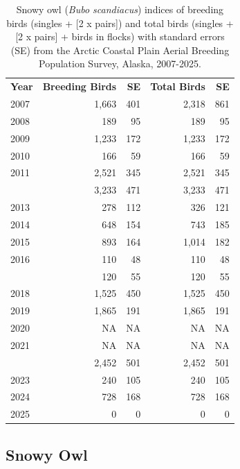 \documentclass[
]{article}
\begin{document}
\begin{longtable}[t]{lrrrr}

\caption{\label{tbl-SNOW}Snowy owl (\emph{Bubo scandiacus}) indices of
breeding birds (singles + {[}2 x pairs{]}) and total birds (singles +
{[}2 x pairs{]} + birds in flocks) with standard errors (SE) from the
Arctic Coastal Plain Aerial Breeding Population Survey, Alaska,
2007-2025.}

\tabularnewline

\\
\toprule
\textbf{Year} & \textbf{Breeding Birds} & \textbf{SE} & \textbf{Total Birds} & \textbf{SE}\\
\midrule
2007 & 1,663 & 401 & 2,318 & 861\\
2008 & 189 & 95 & 189 & 95\\
2009 & 1,233 & 172 & 1,233 & 172\\
2010 & 166 & 59 & 166 & 59\\
2011 & 2,521 & 345 & 2,521 & 345\\
\addlinespace
2012 & 3,233 & 471 & 3,233 & 471\\
2013 & 278 & 112 & 326 & 121\\
2014 & 648 & 154 & 743 & 185\\
2015 & 893 & 164 & 1,014 & 182\\
2016 & 110 & 48 & 110 & 48\\
\addlinespace
2017 & 120 & 55 & 120 & 55\\
2018 & 1,525 & 450 & 1,525 & 450\\
2019 & 1,865 & 191 & 1,865 & 191\\
2020 & NA & NA & NA & NA\\
2021 & NA & NA & NA & NA\\
\addlinespace
2022 & 2,452 & 501 & 2,452 & 501\\
2023 & 240 & 105 & 240 & 105\\
2024 & 728 & 168 & 728 & 168\\
2025 & 0 & 0 & 0 & 0\\
\bottomrule

\end{longtable}

\endgroup{}

\newpage{}

\subsection*{Snowy Owl}\label{snowy-owl-2}
\end{document}

